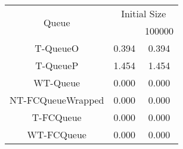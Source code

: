 \begin{tabular}{|c|c|c|}
\hline
\multirow{2}{*}{Queue} & \multicolumn{2}{c|}{Initial Size}\\\cline{2-3}& \qquad 10000 \qquad\quad & 100000\\
\hline
\hline
T-QueueO & 0.394 & 0.394\\
T-QueueP & 1.454 & 1.454\\
WT-Queue & 0.000 & 0.000\\
NT-FCQueueWrapped & 0.000 & 0.000\\
T-FCQueue & 0.000 & 0.000\\
WT-FCQueue & 0.000 & 0.000\\
\hline\end{tabular}
